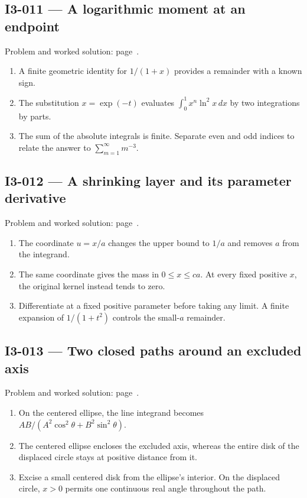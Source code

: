 \documentclass[11pt,oneside,openany]{book}
\begin{document}
\subsection*{I3-011 --- A logarithmic moment at an endpoint}
\label{hints:I3-011}
Problem and worked solution: page~\pageref{problem:I3-011}.

\begin{enumerate}
\item A finite geometric identity for \(1/(1+x)\) provides a remainder with a known sign.
\item The substitution \(x=\exp(-t)\) evaluates \(\int_0^1x^n\ln^2x\,dx\) by two integrations by parts.
\item The sum of the absolute integrals is finite. Separate even and odd indices to relate the answer to \(\sum_{m=1}^\infty m^{-3}\).
\end{enumerate}
\subsection*{I3-012 --- A shrinking layer and its parameter derivative}
\label{hints:I3-012}
Problem and worked solution: page~\pageref{problem:I3-012}.

\begin{enumerate}
\item The coordinate \(u=x/a\) changes the upper bound to \(1/a\) and removes \(a\) from the integrand.
\item The same coordinate gives the mass in \(0\le x\le ca\). At every fixed positive \(x\), the original kernel instead tends to zero.
\item Differentiate at a fixed positive parameter before taking any limit. A finite expansion of \(1/(1+t^2)\) controls the small-\(a\) remainder.
\end{enumerate}
\subsection*{I3-013 --- Two closed paths around an excluded axis}
\label{hints:I3-013}
Problem and worked solution: page~\pageref{problem:I3-013}.

\begin{enumerate}
\item On the centered ellipse, the line integrand becomes \(AB/(A^2\cos^2\theta+B^2\sin^2\theta)\).
\item The centered ellipse encloses the excluded axis, whereas the entire disk of the displaced circle stays at positive distance from it.
\item Excise a small centered disk from the ellipse's interior. On the displaced circle, \(x>0\) permits one continuous real angle throughout the path.
\end{enumerate}
\end{document}
